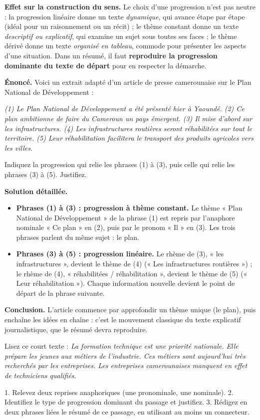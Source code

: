 \documentclass[11pt]{article}
\begin{document}
\textbf{Effet sur la construction du sens.} Le choix d'une progression n'est pas neutre : la progression linéaire donne un texte \emph{dynamique}, qui avance étape par étape (idéal pour un raisonnement ou un récit) ; le thème constant donne un texte \emph{descriptif ou explicatif}, qui examine un sujet sous toutes ses faces ; le thème dérivé donne un texte \emph{organisé en tableau}, commode pour présenter les aspects d'une situation. Dans un résumé, il faut \textbf{reproduire la progression dominante du texte de départ} pour en respecter la démarche.

\begin{exoresolu}
\textbf{Énoncé.} Voici un extrait adapté d'un article de presse camerounaise sur le Plan National de Développement :

\emph{(1) Le Plan National de Développement a été présenté hier à Yaoundé. (2) Ce plan ambitionne de faire du Cameroun un pays émergent. (3) Il mise d'abord sur les infrastructures. (4) Les infrastructures routières seront réhabilitées sur tout le territoire. (5) Leur réhabilitation facilitera le transport des produits agricoles vers les villes.}

Indiquez la progression qui relie les phrases (1) à (3), puis celle qui relie les phrases (3) à (5). Justifiez.

\tcblower
\textbf{Solution détaillée.}
\begin{itemize}
\item \textbf{Phrases (1) à (3) : progression à thème constant.} Le thème « Plan National de Développement » de la phrase (1) est repris par l'anaphore nominale « Ce plan » en (2), puis par le pronom « Il » en (3). Les trois phrases parlent du même sujet : le plan.
\item \textbf{Phrases (3) à (5) : progression linéaire.} Le rhème de (3), « les infrastructures », devient le thème de (4) (« Les infrastructures routières ») ; le rhème de (4), « réhabilitées / réhabilitation », devient le thème de (5) (« Leur réhabilitation »). Chaque information nouvelle devient le point de départ de la phrase suivante.
\end{itemize}
\textbf{Conclusion.} L'article commence par approfondir un thème unique (le plan), puis enchaîne les idées en chaîne : c'est le mouvement classique du texte explicatif journalistique, que le résumé devra reproduire.
\end{exoresolu}

\begin{exercice}
Lisez ce court texte : \emph{La formation technique est une priorité nationale. Elle prépare les jeunes aux métiers de l'industrie. Ces métiers sont aujourd'hui très recherchés par les entreprises. Les entreprises camerounaises manquent en effet de techniciens qualifiés.}

1. Relevez deux reprises anaphoriques (une pronominale, une nominale).
2. Identifiez le type de progression dominant du passage et justifiez.
3. Rédigez en deux phrases liées le résumé de ce passage, en utilisant au moins un connecteur.
\end{exercice}
\end{document}
